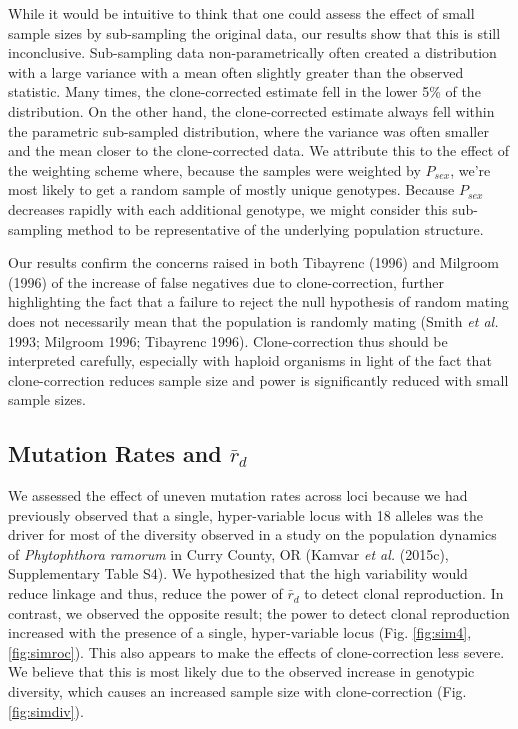 \documentclass[]{article}
\theoremstyle{definition}
\theoremstyle{definition}
\theoremstyle{definition}
\theoremstyle{remark}
\begin{document}
While it would be intuitive to think that one could assess the effect of
small sample sizes by sub-sampling the original data, our results show
that this is still inconclusive. Sub-sampling data non-parametrically
often created a distribution with a large variance with a mean often
slightly greater than the observed statistic. Many times, the
clone-corrected estimate fell in the lower 5\% of the distribution. On
the other hand, the clone-corrected estimate always fell within the
parametric sub-sampled distribution, where the variance was often
smaller and the mean closer to the clone-corrected data. We attribute
this to the effect of the weighting scheme where, because the samples
were weighted by \(P_{sex}\), we're most likely to get a random sample
of mostly unique genotypes. Because \(P_{sex}\) decreases rapidly with
each additional genotype, we might consider this sub-sampling method to
be representative of the underlying population structure.

Our results confirm the concerns raised in both Tibayrenc (1996) and
Milgroom (1996) of the increase of false negatives due to
clone-correction, further highlighting the fact that a failure to reject
the null hypothesis of random mating does not necessarily mean that the
population is randomly mating (Smith \emph{et al.} 1993; Milgroom 1996;
Tibayrenc 1996). Clone-correction thus should be interpreted carefully,
especially with haploid organisms in light of the fact that
clone-correction reduces sample size and power is significantly reduced
with small sample sizes.

\subsection{\texorpdfstring{Mutation Rates and
\(\bar{r}_d\)}{Mutation Rates and \textbackslash{}bar\{r\}\_d}}\label{mutation-rates-and-barr_d}

We assessed the effect of uneven mutation rates across loci because we
had previously observed that a single, hyper-variable locus with 18
alleles was the driver for most of the diversity observed in a study on
the population dynamics of \emph{Phytophthora ramorum} in Curry County,
OR (Kamvar \emph{et al.} (2015c), Supplementary Table S4). We
hypothesized that the high variability would reduce linkage and thus,
reduce the power of \(\bar{r}_d\) to detect clonal reproduction. In
contrast, we observed the opposite result; the power to detect clonal
reproduction increased with the presence of a single, hyper-variable
locus (Fig. \ref{fig:sim4}, \ref{fig:simroc}). This also appears to make
the effects of clone-correction less severe. We believe that this is
most likely due to the observed increase in genotypic diversity, which
causes an increased sample size with clone-correction (Fig.
\ref{fig:simdiv}).
\end{document}

